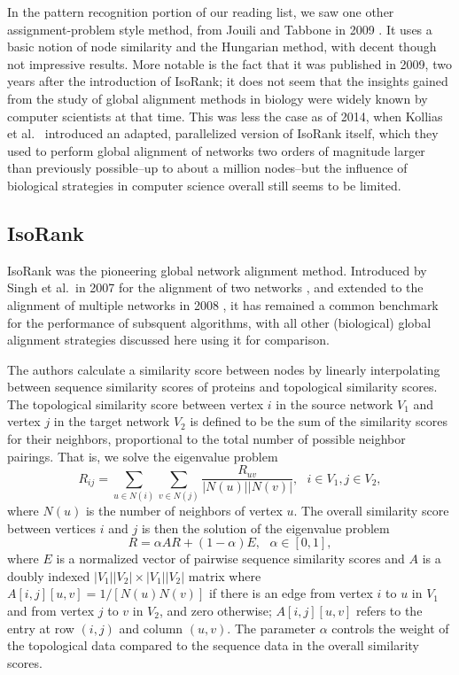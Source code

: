 \documentclass[12pt]{thesis}
\theoremstyle{plain}
\theoremstyle{definition}
\theoremstyle{remark}
\begin{document}
In the pattern recognition portion of our reading list, we saw one other assignment-problem style method, from Jouili and Tabbone in 2009 \cite{Jouili_2009}. It uses a basic notion of node similarity and the Hungarian method, with decent though not impressive results. More notable is the fact that it was published in 2009, two years after the introduction of IsoRank; it does not seem that the insights gained from the study of global alignment methods in biology were widely known by computer scientists at that time. This was less the case as of 2014, when Kollias et al.\ \cite{Kollias_2014} introduced an adapted, parallelized version of IsoRank itself, which they used to perform global alignment of networks two orders of magnitude larger than previously possible--up to about a million nodes--but the influence of biological strategies in computer science overall still seems to be limited.

\subsection{IsoRank}

IsoRank was the pioneering global network alignment method. Introduced by Singh et al.\ in 2007 for the alignment of two networks \cite{Singh_2007}, and extended to the alignment of multiple networks in 2008 \cite{Singh_2008}, it has remained a common benchmark for the performance of subsquent algorithms, with all other (biological) global alignment strategies discussed here using it for comparison. 

The authors calculate a similarity score between nodes by linearly interpolating between sequence similarity scores of proteins and topological similarity scores. The topological similarity score between vertex $i$ in the source network $V_1$ and vertex $j$ in the target network $V_2$ is defined to be the sum of the similarity scores for their neighbors, proportional to the total number of possible neighbor pairings. That is, we solve the eigenvalue problem \[R_{ij} = \sum_{u\in N(i)} \sum_{v\in N(j)} \frac{R_{uv}}{|N(u)||N(v)|}, \text{    } i\in V_1, j\in V_2, \] where $N(u)$ is the number of neighbors of vertex $u$. The overall similarity score between vertices $i$ and $j$ is then the solution of the eigenvalue problem \[R = \alpha AR + (1-\alpha) E, \text{    }\alpha \in [0,1], \] where $E$ is a normalized vector of pairwise sequence similarity scores and $A$ is a doubly indexed $|V_1||V_2|\times |V_1||V_2|$ matrix where $A[i,j][u,v] = 1/[N(u)N(v)]$ if there is an edge from vertex $i$ to $u$ in $V_1$ and from vertex $j$ to $v$ in $V_2$, and zero otherwise; $A[i,j][u,v]$ refers to the entry at row $(i,j)$ and column $(u,v)$. The parameter $\alpha$ controls the weight of the topological data compared to the sequence data in the overall similarity scores.
\end{document}
